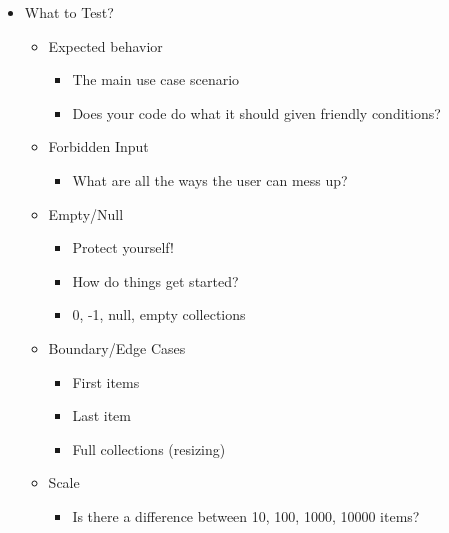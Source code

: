 \begin{section}
    \begin{itemize}
        \item What to Test?
        \begin{itemize}
            \item Expected behavior
            \begin{itemize}
                \item The main use case scenario
                \item Does your code do what it should given friendly conditions?
            \end{itemize}
            \item Forbidden Input
            \begin{itemize}
                \item What are all the ways the user can mess up?
            \end{itemize}
            \item Empty/Null
            \begin{itemize}
                \item Protect yourself!
                \item How do things get started?
                \item 0, -1, null, empty collections
            \end{itemize}
            \item Boundary/Edge Cases
            \begin{itemize}
                \item First items
                \item Last item
                \item Full collections (resizing)
            \end{itemize}
            \item Scale
            \begin{itemize}
                \item Is there a difference between 10, 100, 1000, 10000 items?
            \end{itemize}
        \end{itemize}
    \end{itemize}
\end{section}
